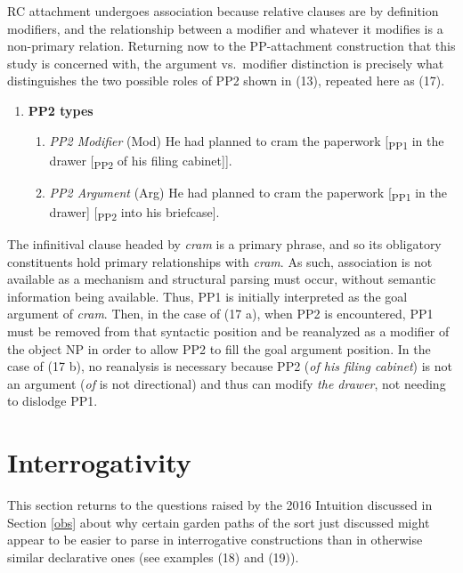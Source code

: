 \documentclass[11pt,oneside]{book}
\providecommand{\tightlist}{%
  \setlength{\itemsep}{0pt}\setlength{\parskip}{0pt}}
\begin{document}
RC attachment undergoes association because relative clauses are by definition modifiers, and the relationship between a modifier and whatever it modifies is a non-primary relation. Returning now to the PP-attachment construction that this study is concerned with, the argument vs.~modifier distinction is precisely what distinguishes the two possible roles of PP2 shown in (13), repeated here as (17).

\begin{enumerate}
\def\labelenumi{(\arabic{enumi})}
\setcounter{enumi}{16}
\tightlist
\item
  \textbf{PP2 types}

  \begin{enumerate}
  \def\labelenumii{\alph{enumii}.}
  \tightlist
  \item
    \emph{PP2 Modifier} (Mod)
    He had planned to cram the paperwork {[}\textsubscript{PP1} in the drawer {[}\textsubscript{PP2} of his filing cabinet{]}{]}.
  \item
    \emph{PP2 Argument} (Arg)
    He had planned to cram the paperwork {[}\textsubscript{PP1} in the drawer{]} {[}\textsubscript{PP2} into his briefcase{]}.
  \end{enumerate}
\end{enumerate}

The infinitival clause headed by \emph{cram} is a primary phrase, and so its obligatory constituents hold primary relationships with \emph{cram}. As such, association is not available as a mechanism and structural parsing must occur, without semantic information being available. Thus, PP1 is initially interpreted as the goal argument of \emph{cram}. Then, in the case of (17 a), when PP2 is encountered, PP1 must be removed from that syntactic position and be reanalyzed as a modifier of the object NP in order to allow PP2 to fill the goal argument position. In the case of (17 b), no reanalysis is necessary because PP2 (\emph{of his filing cabinet}) is not an argument (\emph{of} is not directional) and thus can modify \emph{the drawer}, not needing to dislodge PP1.

\hypertarget{intg}{%
\section{Interrogativity}\label{intg}}

This section returns to the questions raised by the 2016 Intuition discussed in Section \ref{obs} about why certain garden paths of the sort just discussed might appear to be easier to parse in interrogative constructions than in otherwise similar declarative ones (see examples (18) and (19)).
\end{document}
